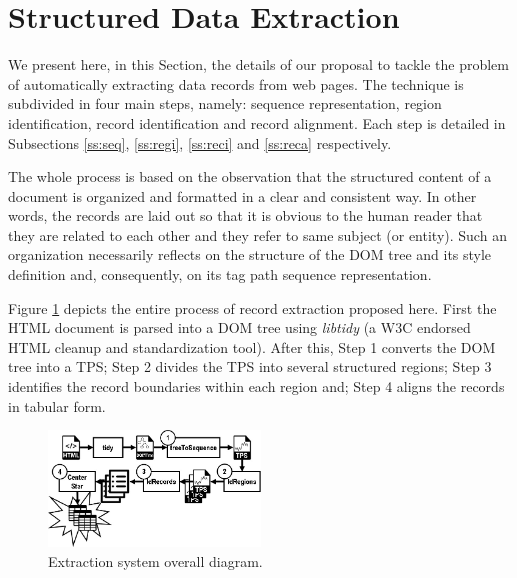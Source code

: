 \vspace{-0.7cm}

\section{Structured Data Extraction}\label{sec:prop} We present here, in this
Section, the details of our proposal to tackle the problem of automatically
extracting data records from web pages. The technique is subdivided in four main
steps, namely:
sequence representation, region identification, record identification and record
alignment. Each step is detailed in Subsections \ref{ss:seq}, \ref{ss:regi},
\ref{ss:reci} and \ref{ss:reca} respectively.

The whole process is based on the observation that the structured content of a
document is organized and formatted in a clear and consistent way. In other
words, the records are laid out so that it is obvious to the human reader that
they are related to each other and they refer to same subject (or entity). Such
an organization necessarily reflects on the structure of the DOM tree and its
style definition and, consequently, on its tag path sequence representation.

Figure \ref{fig:overall} depicts the entire process of record extraction
proposed here. First the HTML document is parsed into a DOM tree using
\textit{libtidy} (a W3C endorsed HTML cleanup and standardization tool).
After this, Step 1 converts the DOM tree into a TPS; Step 2 divides the TPS into
several structured regions; Step 3 identifies the record boundaries within each
region and; Step 4 aligns the records in tabular form.


\begin{figure}[h]
  \centering
     \includegraphics[width=160pt]{img/proposal.jpg}
  \caption{\small{Extraction system overall diagram.}}
  \label{fig:overall}
\end{figure}


